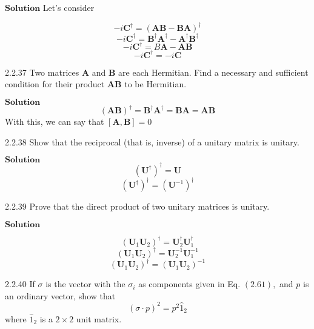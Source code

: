 \documentclass{styles/kaobook}
\begin{document}
$\boxed{\textbf{Solution}}$ Let's consider

$$-i \mathbf{C}^{\dagger}=(\mathbf{A}\mathbf{B}-\mathbf{B}\mathbf{A})^{\dagger}$$
$$-i \mathbf{C}^{\dagger}=\mathbf{B}^{\dagger} \mathbf{A}^{\dagger}-\mathbf{A}^{\dagger} \mathbf{B}^{\dagger}$$
$$-i \mathbf{C}^{\dagger}=B \mathbf{A}-\mathbf{A}\mathbf{B}$$
$$-i \mathbf{C}^{\dagger}=-i \mathbf{C}$$



\begin{greenbox}{2.2.37}
Two matrices $\mathbf{A}$ and $\mathbf{B}$ are each Hermitian. Find a necessary and sufficient condition for
their product $\mathbf{AB}$ to be Hermitian.
\end{greenbox}


$\boxed{\textbf{Solution}}$ 
$$(\mathbf{A}\mathbf{B})^{\dagger}=\mathbf{B}^{\dagger} \mathbf{A}^{\dagger}=\mathbf{B} \mathbf{A}=\mathbf{AB}$$
With this, we can say that $[\mathbf{A}, \mathbf{B}] = 0$



\begin{greenbox}{2.2.38}
Show that the reciprocal (that is, inverse) of a unitary matrix is unitary.
\end{greenbox}


$\boxed{\textbf{Solution}}$ 
$$\left( \mathbf{U}^{\dagger}\right)^{\dagger}=\mathbf{U}$$
$$\left( \mathbf{U}^{\dagger}\right)^{\dagger}=\left( \mathbf{U}^{-1}\right)^{\dagger}$$


\begin{greenbox}{2.2.39}
Prove that the direct product of two unitary matrices is unitary.
\end{greenbox}

$\boxed{\textbf{Solution}}$ 

$$\left( \mathbf{U}_{1}  \mathbf{U}_{2}\right)^{\dagger}= \mathbf{U}_{2}^{\dagger}  \mathbf{U}_{1}^{\dagger}$$
$$\left( \mathbf{U}_{1}  \mathbf{U}_{2}\right)^{\dagger}= \mathbf{U}_{2}^{-1}  \mathbf{U}_{1}^{-1}$$
$$\left( \mathbf{U}_{1}  \mathbf{U}_{2}\right)^{\dagger}=\left( \mathbf{U}_{1}  \mathbf{U}_{2}\right)^{-1}$$



\begin{greenbox}{2.2.40}
If $\sigma$ is the vector with the $\sigma_{i}$ as components given in Eq. $(2.61),$ and $p$ is an ordinary vector, show that
$$(\sigma \cdot p)^{2}=p^{2} \hat{1}_{2}$$
where $\hat{1}_{2}$ is a $2 \times 2$ unit matrix.
\end{greenbox}
\end{document}
